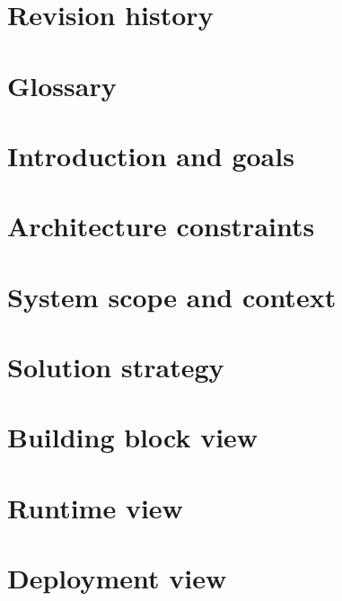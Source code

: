 \documentclass[11pt, oneside]{book}
\begin{document}


\frontmatter

\chapter{Revision history}
\label{chp:rev_his}




\chapter{Glossary}
\label{chp:glos}


\mainmatter

\chapter{Introduction and goals}
\label{chp:intro}


\chapter{Architecture constraints}
\label{chp:arch_constr}


\chapter{System scope and context}
\label{chp:syst_context}


\chapter{Solution strategy}
\label{chp:sol_strategy}


\chapter{Building block view}
\label{chp:build_block}


\chapter{Runtime view}
\label{chp:runtime}


\chapter{Deployment view}
\label{chp:deployment}

\end{document}

